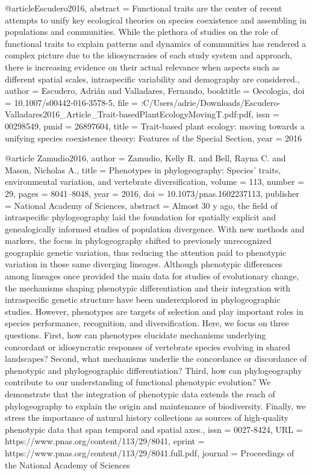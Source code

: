 {@article{Escudero2016,
abstract = {Functional traits are the center of recent attempts to unify key ecological theories on species coexistence and assembling in populations and communities. While the plethora of studies on the role of functional traits to explain patterns and dynamics of communities has rendered a complex picture due to the idiosyncrasies of each study system and approach, there is increasing evidence on their actual relevance when aspects such as different spatial scales, intraspecific variability and demography are considered.},
author = {Escudero, Adri{\'{a}}n and Valladares, Fernando},
booktitle = {Oecologia},
doi = {10.1007/s00442-016-3578-5},
file = {:C\:/Users/adrie/Downloads/Escudero-Valladares2016_Article_Trait-basedPlantEcologyMovingT.pdf:pdf},
issn = {00298549},
pmid = {26897604},
title = {{Trait-based plant ecology: moving towards a unifying species coexistence theory: Features of the Special Section}},
year = {2016}
}

@article {Zamudio2016,
	author = {Zamudio, Kelly R. and Bell, Rayna C. and Mason, Nicholas A.},
	title = {Phenotypes in phylogeography: Species{\textquoteright} traits, environmental variation, and vertebrate diversification},
	volume = {113},
	number = {29},
	pages = {8041--8048},
	year = {2016},
	doi = {10.1073/pnas.1602237113},
	publisher = {National Academy of Sciences},
	abstract = {Almost 30 y ago, the field of intraspecific phylogeography laid the foundation for spatially explicit and genealogically informed studies of population divergence. With new methods and markers, the focus in phylogeography shifted to previously unrecognized geographic genetic variation, thus reducing the attention paid to phenotypic variation in those same diverging lineages. Although phenotypic differences among lineages once provided the main data for studies of evolutionary change, the mechanisms shaping phenotypic differentiation and their integration with intraspecific genetic structure have been underexplored in phylogeographic studies. However, phenotypes are targets of selection and play important roles in species performance, recognition, and diversification. Here, we focus on three questions. First, how can phenotypes elucidate mechanisms underlying concordant or idiosyncratic responses of vertebrate species evolving in shared landscapes? Second, what mechanisms underlie the concordance or discordance of phenotypic and phylogeographic differentiation? Third, how can phylogeography contribute to our understanding of functional phenotypic evolution? We demonstrate that the integration of phenotypic data extends the reach of phylogeography to explain the origin and maintenance of biodiversity. Finally, we stress the importance of natural history collections as sources of high-quality phenotypic data that span temporal and spatial axes.},
	issn = {0027-8424},
	URL = {https://www.pnas.org/content/113/29/8041},
	eprint = {https://www.pnas.org/content/113/29/8041.full.pdf},
	journal = {Proceedings of the National Academy of Sciences}
}


}
